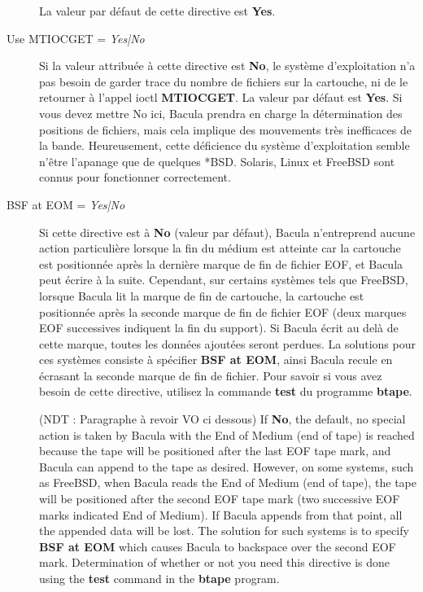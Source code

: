 \begin{description}
   La valeur par d\'efaut de cette directive est  {\bf Yes}.

\item [Use MTIOCGET = {\it Yes|No}]
   Si la valeur attribu\'ee \`a cette directive est {\bf No}, le syst\`eme d'exploitation 
   n'a pas besoin de garder trace du nombre de fichiers sur la cartouche, ni de 
   le retourner \`a l'appel ioctl {\bf MTIOCGET}. La valeur par d\'efaut est {\bf Yes}. 
   Si vous devez mettre No ici, Bacula prendra en charge la d\'etermination des 
   positions de fichiers, mais cela implique des mouvements tr\`es inefficaces de la 
   bande. Heureusement, cette d\'eficience du syst\`eme d'exploitation semble n'\^etre 
   l'apanage que de quelques *BSD. Solaris, Linux et FreeBSD sont connus pour 
   fonctionner correctement.
   
\item [BSF at EOM = {\it Yes|No}]
    Si cette directive est \`a {\bf No} (valeur par d\'efaut), Bacula n'entreprend 
    aucune action particuli\`ere lorsque la fin du m\'edium est atteinte car 
    la cartouche est positionn\'ee apr\`es la derni\`ere marque de fin de fichier EOF, 
    et Bacula peut \'ecrire \`a la suite. Cependant, sur certains syst\`emes tels que 
    FreeBSD, lorsque Bacula lit la marque de fin de cartouche, la cartouche est 
    positionn\'ee apr\`es la seconde marque de fin de fichier EOF (deux marques EOF 
    successives indiquent la fin du support). Si Bacula \'ecrit au del\`a de cette 
    marque, toutes les donn\'ees ajout\'ees seront perdues. La solutions pour ces syst\`emes 
    consiste \`a sp\'ecifier {\bf BSF at EOM}, ainsi Bacula recule en \'ecrasant la 
    seconde marque de fin de fichier. Pour savoir si vous avez besoin de cette 
    directive, utilisez la commande {\bf test} du programme {\bf btape}.
 
(NDT : Paragraphe \`a revoir VO ci dessous) 
   If {\bf No}, the default, no special action is taken by  Bacula with the End
   of Medium (end of tape) is reached because  the tape will be positioned after
   the last EOF tape mark, and  Bacula can append to the tape as desired.
   However, on some  systems, such as FreeBSD, when Bacula reads the End of
   Medium  (end of tape), the tape will be positioned after the second  EOF tape
   mark (two successive EOF marks indicated End of  Medium). If Bacula appends
   from that point, all the appended  data will be lost. The solution for such
   systems is to  specify {\bf BSF at EOM} which causes Bacula to backspace  over
   the second EOF mark. Determination of whether or not  you need this directive
   is done using the {\bf test} command  in the {\bf btape} program.


\end{description}
